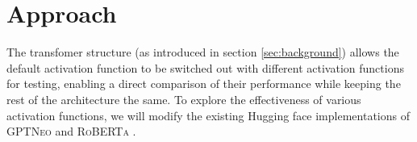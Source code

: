 



\section{Approach} %
\label{sec:approach}
The transfomer structure (as introduced in section \ref{sec:background}) allows the default activation function to be switched out with different activation functions for testing, enabling a direct comparison of their performance while keeping the rest of the architecture the same. To explore the effectiveness of various activation functions, we will modify the existing Hugging face implementations of \textsc{GPTNeo} \cite{huggingfaceNEO} and \textsc{RoBERTa} \cite{huggingfaceRoberta}.

